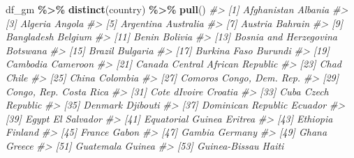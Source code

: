 \documentclass[
  xelatex, ja=standard]{bxjsbook}
\newenvironment{Shaded}{\begin{snugshade}}{\end{snugshade}}
\newcommand{\CommentTok}[1]{\textcolor[rgb]{0.56,0.35,0.01}{\textit{#1}}}
\newcommand{\FunctionTok}[1]{\textcolor[rgb]{0.13,0.29,0.53}{\textbf{#1}}}
\newcommand{\NormalTok}[1]{#1}
\newcommand{\SpecialCharTok}[1]{\textcolor[rgb]{0.81,0.36,0.00}{\textbf{#1}}}
\theoremstyle{definition}
\theoremstyle{definition}
\theoremstyle{definition}
\theoremstyle{definition}
\theoremstyle{remark}
\begin{document}
\begin{Shaded}
\begin{Highlighting}[]
\NormalTok{df\_gm }\SpecialCharTok{\%\textgreater{}\%} \FunctionTok{distinct}\NormalTok{(country) }\SpecialCharTok{\%\textgreater{}\%} \FunctionTok{pull}\NormalTok{()}
\CommentTok{\#\textgreater{}   [1] Afghanistan              Albania                 }
\CommentTok{\#\textgreater{}   [3] Algeria                  Angola                  }
\CommentTok{\#\textgreater{}   [5] Argentina                Australia               }
\CommentTok{\#\textgreater{}   [7] Austria                  Bahrain                 }
\CommentTok{\#\textgreater{}   [9] Bangladesh               Belgium                 }
\CommentTok{\#\textgreater{}  [11] Benin                    Bolivia                 }
\CommentTok{\#\textgreater{}  [13] Bosnia and Herzegovina   Botswana                }
\CommentTok{\#\textgreater{}  [15] Brazil                   Bulgaria                }
\CommentTok{\#\textgreater{}  [17] Burkina Faso             Burundi                 }
\CommentTok{\#\textgreater{}  [19] Cambodia                 Cameroon                }
\CommentTok{\#\textgreater{}  [21] Canada                   Central African Republic}
\CommentTok{\#\textgreater{}  [23] Chad                     Chile                   }
\CommentTok{\#\textgreater{}  [25] China                    Colombia                }
\CommentTok{\#\textgreater{}  [27] Comoros                  Congo, Dem. Rep.        }
\CommentTok{\#\textgreater{}  [29] Congo, Rep.              Costa Rica              }
\CommentTok{\#\textgreater{}  [31] Cote d\textquotesingle{}Ivoire            Croatia                 }
\CommentTok{\#\textgreater{}  [33] Cuba                     Czech Republic          }
\CommentTok{\#\textgreater{}  [35] Denmark                  Djibouti                }
\CommentTok{\#\textgreater{}  [37] Dominican Republic       Ecuador                 }
\CommentTok{\#\textgreater{}  [39] Egypt                    El Salvador             }
\CommentTok{\#\textgreater{}  [41] Equatorial Guinea        Eritrea                 }
\CommentTok{\#\textgreater{}  [43] Ethiopia                 Finland                 }
\CommentTok{\#\textgreater{}  [45] France                   Gabon                   }
\CommentTok{\#\textgreater{}  [47] Gambia                   Germany                 }
\CommentTok{\#\textgreater{}  [49] Ghana                    Greece                  }
\CommentTok{\#\textgreater{}  [51] Guatemala                Guinea                  }
\CommentTok{\#\textgreater{}  [53] Guinea{-}Bissau            Haiti                   }

\end{Highlighting}
\end{Shaded}
\end{document}
